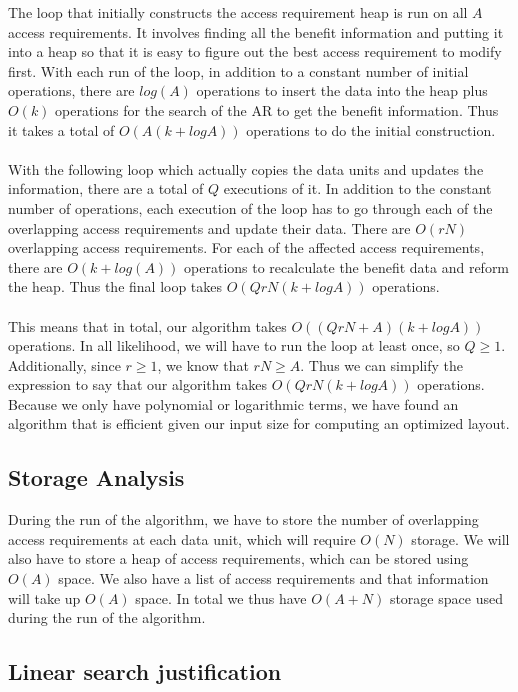 \documentclass[conference]{acmsiggraph}
\begin{document}
The loop that initially constructs the access requirement heap is run on all $A$ access requirements. It involves finding all the benefit information and putting it into a heap so that it is easy to figure out the best access requirement to modify first. With each run of the loop, in addition to a constant number of initial operations, there are $log(A)$ operations to insert the data into the heap plus $O(k)$ operations for the search of the AR to get the benefit information. Thus it takes a total of $O(A (k + logA))$ operations to do the initial construction. \\
\\
With the following loop which actually copies the data units and updates the information, there are a total of $Q$ executions of it. In addition to the constant number of operations, each execution of the loop has to go through each of the overlapping access requirements and update their data. There are $O(rN)$ overlapping access requirements. For each of the affected access requirements, there are $O(k + log(A))$ operations to recalculate the benefit data and reform the heap. Thus the final loop takes $O(QrN(k + logA))$ operations. \\
\\
This means that in total, our algorithm takes $O((QrN + A)(k + logA))$ operations. In all likelihood, we will have to run the loop at least once, so $Q \geq 1$. Additionally, since $r \geq 1$, we know that $rN \geq A$. Thus we can simplify the expression to say that our algorithm takes $O(QrN(k + logA))$ operations. Because we only have polynomial or logarithmic terms, we have found an algorithm that is efficient given our input size for computing an optimized layout.

\subsection{Storage Analysis}

During the run of the algorithm, we have to store the number of overlapping access requirements at each data unit, which will require $O(N)$ storage. We will also have to store a heap of access requirements, which can be stored using $O(A)$ space. We also have a list of access requirements and that information will take up $O(A)$ space. In total we thus have $O(A + N)$ storage space used during the run of the algorithm. 


\subsection{Linear search justification}
\end{document}

